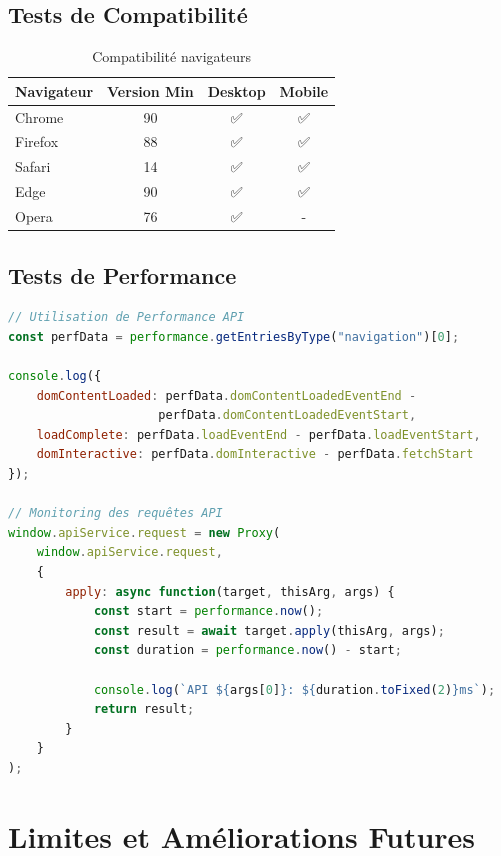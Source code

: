 \documentclass[12pt,a4paper]{article}
\begin{document}
\subsection{Tests de Compatibilité}

\begin{table}[H]
\centering
\begin{tabular}{lccc}
\toprule
\textbf{Navigateur} & \textbf{Version Min} & \textbf{Desktop} & \textbf{Mobile} \\
\midrule
Chrome & 90 & ✅ & ✅ \\
Firefox & 88 & ✅ & ✅ \\
Safari & 14 & ✅ & ✅ \\
Edge & 90 & ✅ & ✅ \\
Opera & 76 & ✅ & - \\
\bottomrule
\end{tabular}
\caption{Compatibilité navigateurs}
\end{table}

\subsection{Tests de Performance}

\begin{lstlisting}[language=JavaScript,caption=Mesures de performance]
// Utilisation de Performance API
const perfData = performance.getEntriesByType("navigation")[0];

console.log({
    domContentLoaded: perfData.domContentLoadedEventEnd - 
                     perfData.domContentLoadedEventStart,
    loadComplete: perfData.loadEventEnd - perfData.loadEventStart,
    domInteractive: perfData.domInteractive - perfData.fetchStart
});

// Monitoring des requêtes API
window.apiService.request = new Proxy(
    window.apiService.request, 
    {
        apply: async function(target, thisArg, args) {
            const start = performance.now();
            const result = await target.apply(thisArg, args);
            const duration = performance.now() - start;
            
            console.log(`API ${args[0]}: ${duration.toFixed(2)}ms`);
            return result;
        }
    }
);
\end{lstlisting}

\section{Limites et Améliorations Futures}
\end{document}
